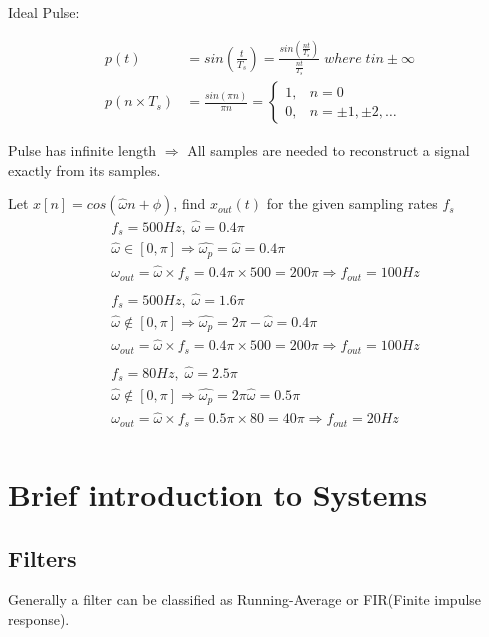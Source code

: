 \documentclass{article}
\begin{document}
    Ideal Pulse:

    \begin{align}
        p(t) &= sin(\frac{t}{T_s}) = \frac{sin(\frac{nt}{T_s})}{\frac{nt}{T_s}}\;where\;t in \pm \infty\\
        p(n \times T_s) &= \frac{sin(\pi n)}{\pi n} =
        \begin{cases}
            1, & n=0\\
            0, & n = \pm 1, \pm 2, \dots
        \end{cases} 
    \end{align}

    \noindent Pulse has infinite length $\Rightarrow$ All samples are needed to reconstruct a signal exactly from its samples.

    Let $x[n] = cos(\hat{\omega}n+\phi)$, find $x_{out}(t)$ for the given sampling rates $f_s$
    \begin{align}
        &f_s = 500 Hz,\;\hat{\omega} = 0.4\pi\\
        &\hat{\omega} \in [0,\pi] \Rightarrow \hat{\omega_{p}} = \hat{\omega} = 0.4\pi\\
        &\omega_{out} = \hat{\omega} \times f_s = 0.4\pi \times 500 = 200\pi \Rightarrow f_{out} = 100Hz\\
        &\nonumber\\
        &f_s = 500 Hz,\;\hat{\omega} = 1.6\pi\\
        &\hat{\omega} \notin [0,\pi] \Rightarrow \hat{\omega_{p}} = 2\pi-\hat{\omega} = 0.4\pi\\
        &\omega_{out} = \hat{\omega} \times f_s = 0.4\pi \times 500 = 200\pi \Rightarrow f_{out} = 100Hz\\
        &\nonumber\\
        &f_s = 80 Hz,\;\hat{\omega} = 2.5\pi\\
        &\hat{\omega} \notin [0,\pi] \Rightarrow \hat{\omega_{p}} = 2\pi\hat{\omega} = 0.5\pi\\
        &\omega_{out} = \hat{\omega} \times f_s = 0.5\pi \times 80 = 40\pi \Rightarrow f_{out} = 20Hz\\
    \end{align}

\section{Brief introduction to Systems}
    \subsection{Filters}
    Generally a filter can be classified as Running-Average or FIR(Finite impulse response). 
\end{document}
